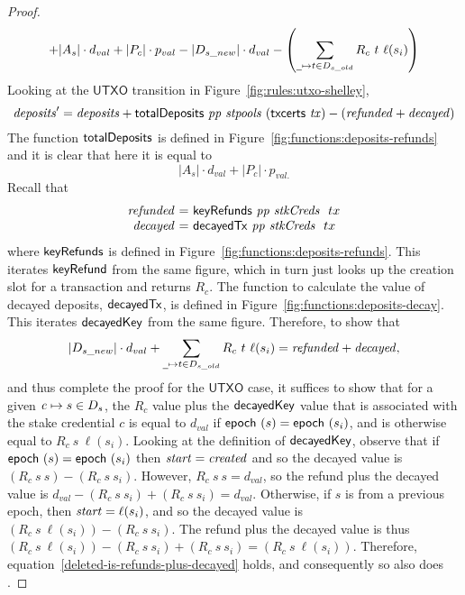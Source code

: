 \begin{proof}
\begin{equation*}
    + |A_s|\cdot d_{val}
    + |P_c|\cdot p_{val}
    - |D_{s\_new}|\cdot d_{val}
    - \left(\sum_{\wcard\mapsto t\in D_{s\_old}}R_c~t~\ell(s_i)\right)
  \end{equation*}
  Looking at the $\mathsf{UTXO}$ transition in Figure~\ref{fig:rules:utxo-shelley},
  \begin{equation*}
    \mathit{deposits}' = \mathit{deposits} + \mathsf{totalDeposits}~ \mathit{pp} ~ \mathit{stpools} ~ \mathit{(\mathsf{txcerts}~ \mathit{tx})}
    - (\mathit{refunded} + \mathit{decayed})
  \end{equation*}
  The function $\mathsf{totalDeposits}$ is defined in Figure~\ref{fig:functions:deposits-refunds}
  and it is clear that here it is equal to
  $$|A_s|\cdot d_{val} + |P_c|\cdot p_{val.}$$
  Recall that
  \begin{equation*}
    \begin{array}{r@{~=~}l}
      \var{refunded} & \keyRefunds{pp}{stkCreds}~{tx} \\
      \var{decayed} & \decayedTx{pp}{stkCreds}~{tx}
    \end{array}
  \end{equation*}
  where $\mathsf{keyRefunds}$ is defined in Figure~\ref{fig:functions:deposits-refunds}.
  This iterates $\mathsf{keyRefund}$ from the same figure,
  which in turn just looks up the creation slot for a transaction and returns $R_c$.
  The function to calculate the value of decayed deposits, $\mathsf{decayedTx}$, is defined in Figure~\ref{fig:functions:deposits-decay}.
  This iterates $\mathsf{decayedKey}$ from the same figure.
  Therefore, to show that
  \begin{equation}\label{deleted-is-refunds-plus-decayed}
    |D_{s\_new}|\cdot d_{val} + \sum_{\wcard\mapsto t\in D_{s\_old}}R_c~t~\ell(s_i)
    = \var{refunded} + \var{decayed},
  \end{equation}
  and thus complete the proof for the $\mathsf{UTXO}$ case,
  it suffices to show that for a given $\mathit{c}\mapsto s\in D_s$,
  the $R_c$ value plus the $\mathsf{decayedKey}$ value that is associated with the stake
  credential $c$ is equal to $d_{val}$ if $\mathsf{epoch}~ \mathit{(}s)=\mathsf{epoch}~ \mathit{(}s_i)$, and is otherwise equal to $R_c~s~\ell(s_i)$.
  Looking at the definition of $\mathsf{decayedKey}$, observe that if $\mathsf{epoch}~ \mathit{(}s)=\mathsf{epoch}~ \mathit{(}s_i)$
  then $\mathit{start}=\mathit{created}$ and so the decayed value is $(R_c~s~s)-(R_c~s~s_i)$.
  However, $R_c~s~s = d_{val}$, so the refund plus the decayed value is
  $d_{val}-(R_c~s~s_i)+(R_c~s~s_i)=d_{val}$.
  Otherwise, if $s$ is from a previous epoch, then $\mathit{start}=\ell(s_i)$, and so
  the decayed value is $(R_c~s~\ell(s_i))-(R_c~s~s_i)$.
  The refund plus the decayed value is thus
  $(R_c~s~\ell(s_i))-(R_c~s~s_i)+(R_c~s~s_i)=(R_c~s~\ell(s_i))$.
  Therefore, equation~\ref{deleted-is-refunds-plus-decayed} holds, and
  consequently so also does .

\end{proof}

